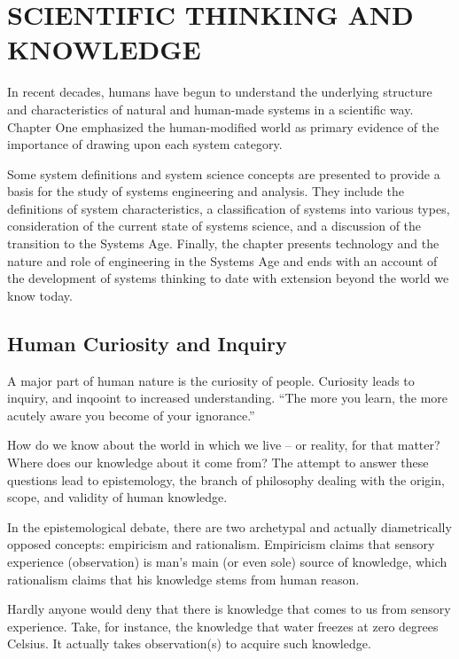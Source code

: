 \chapter{SCIENTIFIC THINKING AND KNOWLEDGE}\label{chap:2}

In recent decades, humans have begun to understand the underlying structure and characteristics of natural and human-made systems in a scientific way. Chapter One emphasized the human-modified world as primary evidence of the importance of drawing upon each system category.

Some system definitions and system science concepts are presented to provide a basis for the study of systems engineering and analysis. They include the definitions of system characteristics, a classification of systems into various types, consideration of the current state of systems science, and a discussion of the transition to the Systems Age. Finally, the chapter presents technology and the nature and role of engineering in the Systems Age and ends with an account of the development of systems thinking to date with extension beyond the world we know today.

\section{Human Curiosity and Inquiry}

A major part of human nature is the curiosity of people. Curiosity leads to inquiry, and inqooint to increased understanding. “The more you learn, the more acutely aware you become of your ignorance.”

How do we know about the world in which we live – or reality, for that matter?  Where does our knowledge about it come from?  The attempt to answer these questions lead to epistemology, the branch of philosophy dealing with the origin, scope, and validity of human knowledge.

In the epistemological debate, there are two archetypal and actually diametrically opposed concepts: empiricism and rationalism. Empiricism claims that sensory experience (observation) is man’s main (or even sole) source of knowledge, which rationalism claims that his knowledge stems from human reason.

Hardly anyone would deny that there is knowledge that comes to us from sensory experience. Take, for instance, the knowledge that water freezes at zero degrees Celsius. It actually takes observation(s) to acquire such knowledge.

